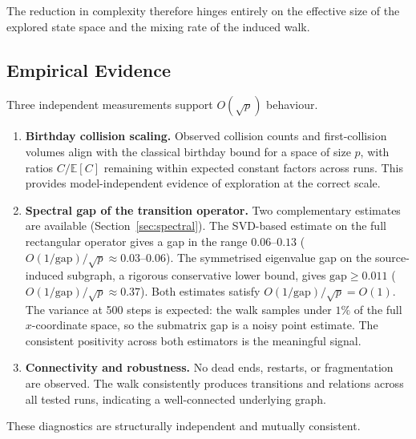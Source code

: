 \documentclass[11pt]{article}
\theoremstyle{definition}
\theoremstyle{remark}
\newcommand{\BigO}[1]{O\!\left(#1\right)}
\begin{document}
The reduction in complexity therefore hinges entirely on the effective size of
the explored state space and the mixing rate of the induced walk.

\subsection{Empirical Evidence}

Three independent measurements support $\BigO{\sqrt{p}}$ behaviour.

\begin{enumerate}
  \item \textbf{Birthday collision scaling.} Observed collision counts and
        first-collision volumes align with the classical birthday bound for a
        space of size $p$, with ratios $C/\mathbb{E}[C]$ remaining within
        expected constant factors across runs. This provides model-independent
        evidence of exploration at the correct scale.

  \item \textbf{Spectral gap of the transition operator.} Two complementary
        estimates are available (Section~\ref{sec:spectral}). The SVD-based
        estimate on the full rectangular operator gives a gap in the range
        $0.06$--$0.13$ ($\BigO{1/\mathrm{gap}}/\sqrt{p} \approx 0.03$--$0.06$).
        The symmetrised eigenvalue gap on the source-induced subgraph, a
        rigorous conservative lower bound, gives $\mathrm{gap} \geq 0.011$
        ($\BigO{1/\mathrm{gap}}/\sqrt{p} \approx 0.37$). Both estimates satisfy
        $\BigO{1/\mathrm{gap}}/\sqrt{p} = \BigO{1}$. The variance at 500 steps
        is expected: the walk samples under $1\%$ of the full $x$-coordinate
        space, so the submatrix gap is a noisy point estimate. The consistent
        positivity across both estimators is the meaningful signal.

  \item \textbf{Connectivity and robustness.} No dead ends, restarts, or
        fragmentation are observed. The walk consistently produces transitions
        and relations across all tested runs, indicating a well-connected
        underlying graph.
\end{enumerate}

These diagnostics are structurally independent and mutually consistent.

\end{document}
